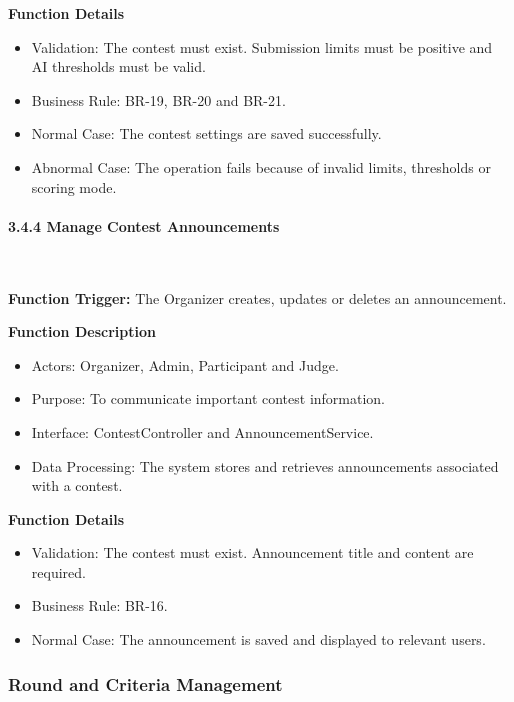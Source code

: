 \textbf{Function Details}
\begin{itemize}[leftmargin=1.5em, nosep]
    \item Validation: The contest must exist. Submission limits must be positive and AI thresholds must be valid.
    \item Business Rule: BR-19, BR-20 and BR-21.
    \item Normal Case: The contest settings are saved successfully.
    \item Abnormal Case: The operation fails because of invalid limits, thresholds or scoring mode.
\end{itemize}

\paragraph*{3.4.4 Manage Contest Announcements}\leavevmode\\[-0.5em]
\label{par:manage-contest-announcements}

\textbf{Function Trigger:} The Organizer creates, updates or deletes an announcement.

\textbf{Function Description}
\begin{itemize}[leftmargin=1.5em, nosep]
    \item Actors: Organizer, Admin, Participant and Judge.
    \item Purpose: To communicate important contest information.
    \item Interface: ContestController and AnnouncementService.
    \item Data Processing: The system stores and retrieves announcements associated with a contest.
\end{itemize}

\textbf{Function Details}
\begin{itemize}[leftmargin=1.5em, nosep]
    \item Validation: The contest must exist. Announcement title and content are required.
    \item Business Rule: BR-16.
    \item Normal Case: The announcement is saved and displayed to relevant users.
\end{itemize}

\subsubsection{Round and Criteria Management}
\label{subsubsec:round-criteria-management}

